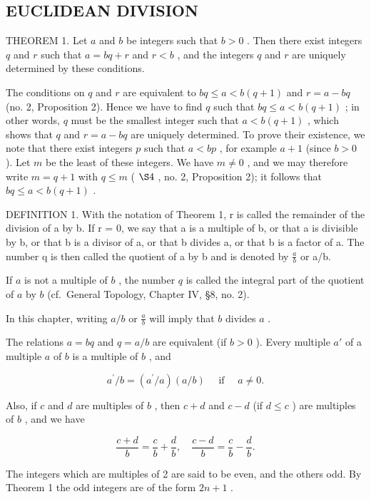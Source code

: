 \subsection{EUCLIDEAN DIVISION}

THEOREM 1. Let \(a\) and \(b\) be integers such that \(b > 0\) . Then there exist integers \(q\) and \(r\) such that \(a = bq + r\) and \(r < b\) , and the integers \(q\) and \(r\) are uniquely determined by these conditions.

The conditions on \(q\) and \(r\) are equivalent to \(bq \leqslant a < b(q + 1)\) and \(r = a - bq\) (no. 2, Proposition 2). Hence we have to find \(q\) such that \(bq \leqslant a < b(q + 1)\) ; in other words, \(q\) must be the smallest integer such that \(a < b(q + 1)\) , which shows that \(q\) and \(r = a - bq\) are uniquely determined. To prove their existence, we note that there exist integers \(p\) such that \(a < bp\) , for example \(a + 1\) (since \(b > 0\) ). Let \(m\) be the least of these integers. We have \(m \neq 0\) , and we may therefore write \(m = q + 1\) with \(q \leqslant m\) ( \(\S 4\) , no. 2, Proposition 2); it follows that \(bq \leqslant a < b(q + 1)\) .

DEFINITION 1. With the notation of Theorem 1, r is called the remainder of the division of a by b. If r = 0, we say that a is a multiple of b, or that a is divisible by b, or that b is a divisor of a, or that b divides a, or that b is a factor of a. The number q is then called the quotient of a by b and is denoted by \(\frac{a}{b}\) or a/b.

If \(a\) is not a multiple of \(b\) , the number \(q\) is called the integral part of the quotient of \(a\) by \(b\) (cf.~General Topology, Chapter IV, §8, no. 2).

In this chapter, writing \(a / b\) or \(\frac{a}{b}\) will imply that \(b\) divides \(a\) .

The relations \(a = bq\) and \(q = a / b\) are equivalent (if \(b > 0\) ). Every multiple \(a'\) of a multiple \(a\) of \(b\) is a multiple of \(b\) , and

\[
a ^ {\prime} / b = (a ^ {\prime} / a) (a / b) \quad \text { if } \quad a \neq 0.
\]

Also, if \(c\) and \(d\) are multiples of \(b\) , then \(c + d\) and \(c - d\) (if \(d \leqslant c\) ) are multiples of \(b\) , and we have

\[
\frac {c + d}{b} = \frac {c}{b} + \frac {d}{b}, \quad \frac {c - d}{b} = \frac {c}{b} - \frac {d}{b}.
\]

The integers which are multiples of 2 are said to be even, and the others odd. By Theorem 1 the odd integers are of the form \(2n + 1\) .

